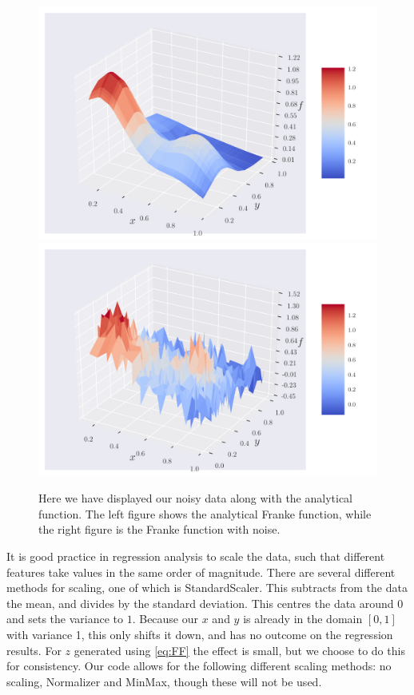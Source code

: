 \documentclass[reprint,english,notitlepage,aps,nobalancelastpage,nofootinbib]{revtex4-1}  %
\begin{document}
\begin{figure}[!htb]
	\includegraphics[width=\linewidth]{Frank_anal_eps_0.pdf}
	\endminipage\hfill
	\includegraphics[width=\linewidth]{Franke_rawdata_eps02.pdf}
	\endminipage
	\caption{Here we have displayed our noisy data along with the analytical function. The left figure shows the analytical Franke function, while the right figure is the Franke function with noise.}\label{fig:FF_dataset}
\end{figure}

It is good practice in regression analysis to scale the data, such that different features take values in the same order of magnitude. There are several different methods for scaling, one of which is StandardScaler. This subtracts from the data the mean, and divides by the standard deviation. This centres the data around $0$ and sets the variance to $1$. Because our $x$ and $y$ is already in the domain $[0, 1]$ with variance 1, this only shifts it down, and has no outcome on the regression results. For $z$ generated using \eqref{eq:FF} the effect is small, but we choose to do this for consistency. Our code allows for the following different scaling methods: no scaling, Normalizer and MinMax, though these will not be used.
\end{document}
